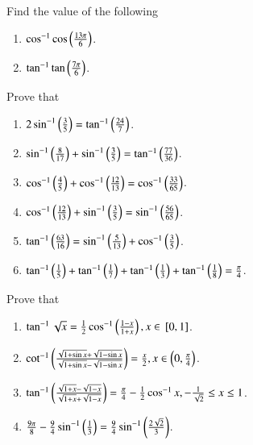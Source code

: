 Find the value of the following
\begin{enumerate}[label=\thesubsection.\arabic*,ref=\thesubsection.\theenumi,resume*,itemsep=1ex]
\item $\cos^{-1}\cos\left(\frac{13\pi}{6}\right)$.
\item $\tan^{-1}\tan\left(\frac{7\pi}{6}\right)$.
\end{enumerate}
Prove that
\begin{enumerate}[label=\thesubsection.\arabic*,ref=\thesubsection.\theenumi,resume*,itemsep=1ex]
	\item $2\sin^{-1}\left(\frac{3}{5}\right) = \tan^{-1}\left(\frac{24}{7}\right)$.
\item $\sin^{-1}\left(\frac{8}{17}\right) +\sin^{-1}\left(\frac{3}{5}\right) = \tan^{-1}\left(\frac{77}{36}\right)$.
\item $\cos^{-1}\left(\frac{4}{5}\right) +\cos^{-1}\left(\frac{12}{13}\right) = \cos^{-1}\left(\frac{33}{65}\right)$.
\item $\cos^{-1}\left(\frac{12}{13}\right) +\sin^{-1}\left(\frac{3}{5}\right) = \sin^{-1}\left(\frac{56}{65}\right)$.
\item $\tan^{-1}\left(\frac{63}{16}\right) =\sin^{-1}\left(\frac{5}{13}\right) + \cos^{-1}\left(\frac{3}{5}\right)$.
\item $\tan^{-1}\left(\frac{1}{5}\right) +\tan^{-1}\left(\frac{1}{7}\right) + \tan^{-1}\left(\frac{1}{3}\right)+ \tan^{-1}\left(\frac{1}{8}\right) = \frac{\pi}{4}$.
\end{enumerate}
Prove that
\begin{enumerate}[label=\thesubsection.\arabic*,ref=\thesubsection.\theenumi,resume*,itemsep=1ex]
	\item 
		$\tan^{-1}\sqrt{x}=\frac{1}{2}\cos^{-1}\left(\frac{1-x}{1+x}\right), x \in {}\left[0,1\right]$.
	\item 
		$\cot^{-1}\left(\frac{\sqrt{1+\sin x}+\sqrt{1-\sin x}}{{\sqrt{1+\sin x}-\sqrt{1-\sin x}}}\right)=\frac{x}{2}, x \in \left(0,\frac{\pi}{4}\right)$.
	\item 
		$\tan^{-1}\left(\frac{\sqrt{1+ x}-\sqrt{1- x}}{{\sqrt{1+ x}+\sqrt{1- x}}}\right)=\frac{\pi}{4}-\frac{1}{2}\cos^{-1}x, -\frac{1}{\sqrt{2}} \le x \le 1$.
	\item 	$\frac{9\pi}{8}-\frac{9}{4}\sin^{-1}\left(\frac{1}{3}\right)=\frac{9}{4}\sin^{-1}\left(\frac{2\sqrt{2}}{3}\right)$.
\end{enumerate}
